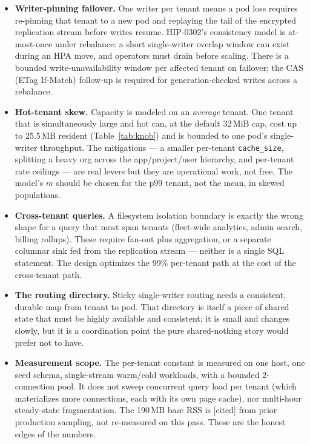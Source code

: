 \documentclass[11pt]{article}
\newcommand{\cited}{\textcolor{purple!70!black}{\small[cited]}}
\begin{document}
\begin{itemize}[leftmargin=1.4em]
\item \textbf{Writer-pinning failover.} One writer per tenant means a pod loss requires
re-pinning that tenant to a new pod and replaying the tail of the encrypted replication stream
before writes resume. HIP-0302's consistency model is at-most-once under rebalance: a short
single-writer overlap window can exist during an HPA move, and operators must drain before
scaling. There is a bounded write-unavailability window per affected tenant on failover; the
CAS (ETag If-Match) follow-up is required for generation-checked writes across a rebalance.

\item \textbf{Hot-tenant skew.} Capacity is modeled on an \emph{average} tenant. One tenant that
is simultaneously large and hot can, at the default 32\,MiB cap, cost up to 25.5\,MB resident
(Table~\ref{tab:knob}) and is bounded to one pod's single-writer throughput. The mitigations ---
a smaller per-tenant \texttt{cache\_size}, splitting a heavy org across the app/project/user
hierarchy, and per-tenant rate ceilings --- are real levers but they are operational work, not
free. The model's $m$ should be chosen for the p99 tenant, not the mean, in skewed populations.

\item \textbf{Cross-tenant queries.} A filesystem isolation boundary is exactly the wrong shape
for a query that must span tenants (fleet-wide analytics, admin search, billing rollups). These
require fan-out plus aggregation, or a separate columnar sink fed from the replication stream ---
neither is a single SQL statement. The design optimizes the 99\% per-tenant path at the cost of
the cross-tenant path.

\item \textbf{The routing directory.} Sticky single-writer routing needs a consistent, durable
map from tenant to pod. That directory is itself a piece of shared state that must be highly
available and consistent; it is small and changes slowly, but it is a coordination point the
pure shared-nothing story would prefer not to have.

\item \textbf{Measurement scope.} The per-tenant constant is measured on one host, one seed
schema, single-stream warm/cold workloads, with a bounded 2-connection pool. It does not sweep
concurrent query load per tenant (which materializes more connections, each with its own page
cache), nor multi-hour steady-state fragmentation. The 190\,MB base RSS is \cited{} from prior
production sampling, not re-measured on this pass. These are the honest edges of the numbers.


\end{itemize}
\end{document}
